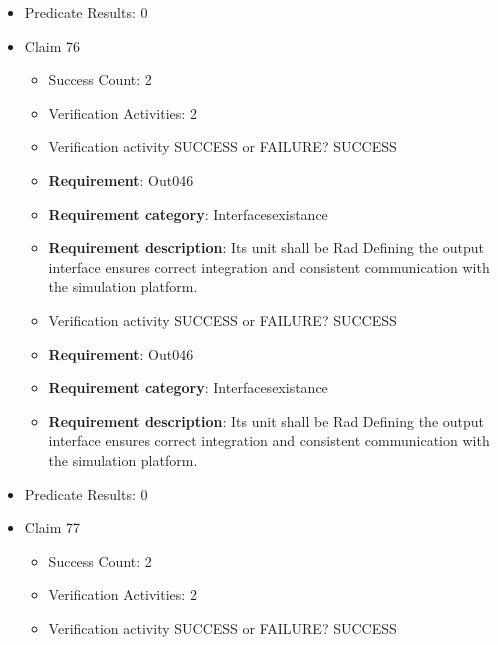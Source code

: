 \documentclass{article}
\begin{document}
\begin{itemize}
\begin{itemize}
					\item Verification activity SUCCESS or FAILURE? SUCCESS
		
						\item \textbf{Requirement}: Out045 
						\item \textbf{Requirement category}: Interfacesexistance 
						\item \textbf{Requirement description}: Its unit shall be Rad Defining the output interface ensures correct integration and consistent communication with the simulation platform.
					
				\end{itemize}
				
									    
				\item Predicate Results: 0

  				  \item Claim 76
				\begin{itemize}
			    	\item Success Count: 2 
			    	\item Verification Activities: 2
					\item Verification activity SUCCESS or FAILURE? SUCCESS
		
						\item \textbf{Requirement}: Out046 
						\item \textbf{Requirement category}: Interfacesexistance 
						\item \textbf{Requirement description}: Its unit shall be Rad Defining the output interface ensures correct integration and consistent communication with the simulation platform.
					
					\item Verification activity SUCCESS or FAILURE? SUCCESS
		
						\item \textbf{Requirement}: Out046 
						\item \textbf{Requirement category}: Interfacesexistance 
						\item \textbf{Requirement description}: Its unit shall be Rad Defining the output interface ensures correct integration and consistent communication with the simulation platform.
					
				\end{itemize}
				
									    
				\item Predicate Results: 0

  				  \item Claim 77
				\begin{itemize}
			    	\item Success Count: 2 
			    	\item Verification Activities: 2
					\item Verification activity SUCCESS or FAILURE? SUCCESS
		

\end{itemize}
\end{itemize}
\end{document}
